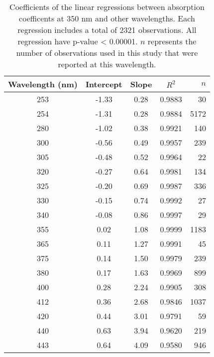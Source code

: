 \begin{table}[ht]
\centering
\begin{tabular}{ccccr}
  \hline
Wavelength (nm) & Intercept & Slope & $R^2$ & $n$ \\ 
  \hline
253 & -1.33 & 0.28 & 0.9883 & 30 \\ 
  254 & -1.31 & 0.28 & 0.9884 & 5172 \\ 
  280 & -1.02 & 0.38 & 0.9921 & 140 \\ 
  300 & -0.56 & 0.49 & 0.9957 & 239 \\ 
  305 & -0.48 & 0.52 & 0.9964 & 22 \\ 
  320 & -0.27 & 0.64 & 0.9981 & 134 \\ 
  325 & -0.20 & 0.69 & 0.9987 & 336 \\ 
  330 & -0.15 & 0.74 & 0.9992 & 27 \\ 
  340 & -0.08 & 0.86 & 0.9997 & 29 \\ 
  355 & 0.02 & 1.08 & 0.9999 & 1183 \\ 
  365 & 0.11 & 1.27 & 0.9991 & 45 \\ 
  375 & 0.14 & 1.50 & 0.9979 & 239 \\ 
  380 & 0.17 & 1.63 & 0.9969 & 899 \\ 
  400 & 0.28 & 2.24 & 0.9905 & 308 \\ 
  412 & 0.36 & 2.68 & 0.9846 & 1037 \\ 
  420 & 0.44 & 3.01 & 0.9791 & 59 \\ 
  440 & 0.63 & 3.94 & 0.9620 & 219 \\ 
  443 & 0.64 & 4.09 & 0.9580 & 946 \\ 
   \hline
\end{tabular}
\caption{Coefficients of the linear regressions between absorption 
coefficents at 350 nm and other wavelengths. Each regression includes a total 
of 2321 observations. All regression have p-value < 0.00001.  $n$ represents 
the number of observations used in this study that were reported at this 
wavelength.} 
\end{table}
